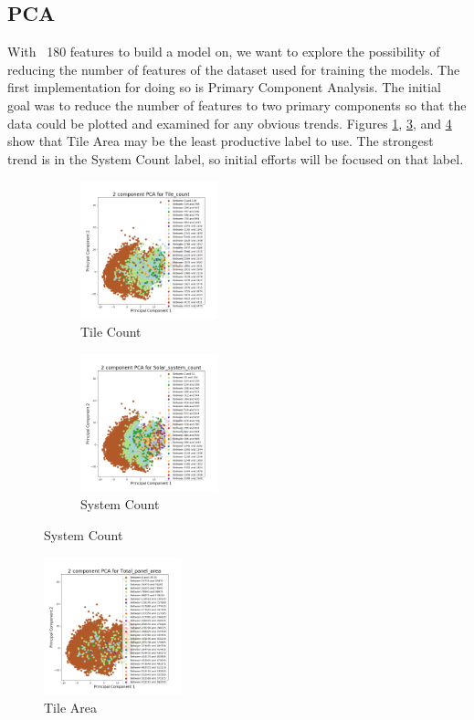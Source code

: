 \documentclass{article}
\begin{document}
	
	\subsection{PCA}
	With ~180 features to build a model on, we want to explore the possibility of reducing the number of features of the dataset used for training the models. The first implementation for doing so is Primary Component Analysis. The initial goal was to reduce the number of features to two primary components so that the data could be plotted and examined for any obvious trends. Figures \ref*{fig:tile_count_pca}, \ref*{fig:system_count_pca}, and \ref*{fig:tile_area_pca} show that Tile Area may be the least productive label to use. The strongest trend is in the System Count label, so initial efforts will be focused on that label.
	
	\setlength{\belowcaptionskip}{-10pt}
	\begin{figure}[H]
		\begin{subfigure}{.5\textwidth}
			\centering
			\includegraphics[width=4cm]{"2_pca_tile_count"}
			\caption{Tile Count}
			\label{fig:tile_count_pca}
		\end{subfigure}
		\begin{subfigure}{.5\textwidth}
			\centering
			\includegraphics[width=4cm]{"2_pca_solar_system_count"}
			\caption{System Count}
			\label{fig:system_count_pca}
		\end{subfigure}
	\end{figure}
	\begin{figure}[H]
		\centering
		\includegraphics[width=4cm]{"2_pca_total_panel_area"}
		\caption{Tile Area}
		\label{fig:tile_area_pca}
	\end{figure}
	
\end{document}
